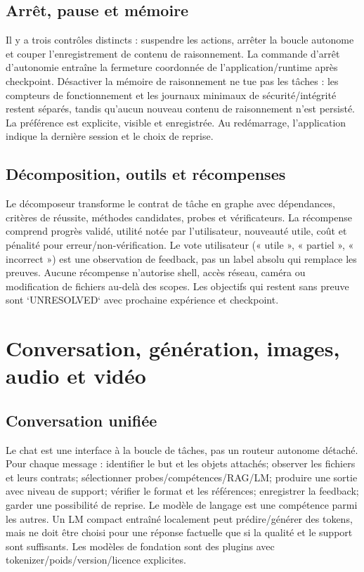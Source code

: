 \documentclass[11pt,a4paper,oneside]{report}
\begin{document}
\section{Arrêt, pause et mémoire}
Il y a trois contrôles distincts : suspendre les actions, arrêter la boucle autonome et couper l'enregistrement de contenu de raisonnement. La commande d'arrêt d'autonomie entraîne la fermeture coordonnée de l'application/runtime après checkpoint. Désactiver la mémoire de raisonnement ne tue pas les tâches : les compteurs de fonctionnement et les journaux minimaux de sécurité/intégrité restent séparés, tandis qu'aucun nouveau contenu de raisonnement n'est persisté. La préférence est explicite, visible et enregistrée. Au redémarrage, l'application indique la dernière session et le choix de reprise.

\section{Décomposition, outils et récompenses}
Le décomposeur transforme le contrat de tâche en graphe avec dépendances, critères de réussite, méthodes candidates, probes et vérificateurs. La récompense comprend progrès validé, utilité notée par l'utilisateur, nouveauté utile, coût et pénalité pour erreur/non-vérification. Le vote utilisateur (« utile », « partiel », « incorrect ») est une observation de feedback, pas un label absolu qui remplace les preuves. Aucune récompense n'autorise shell, accès réseau, caméra ou modification de fichiers au-delà des scopes. Les objectifs qui restent sans preuve sont `UNRESOLVED` avec prochaine expérience et checkpoint.

\chapter{Conversation, génération, images, audio et vidéo}
\section{Conversation unifiée}
Le chat est une interface à la boucle de tâches, pas un routeur autonome détaché. Pour chaque message : identifier le but et les objets attachés; observer les fichiers et leurs contrats; sélectionner probes/compétences/RAG/LM; produire une sortie avec niveau de support; vérifier le format et les références; enregistrer la feedback; garder une possibilité de reprise. Le modèle de langage est une compétence parmi les autres. Un LM compact entraîné localement peut prédire/générer des tokens, mais ne doit être choisi pour une réponse factuelle que si la qualité et le support sont suffisants. Les modèles de fondation sont des plugins avec tokenizer/poids/version/licence explicites.
\end{document}
